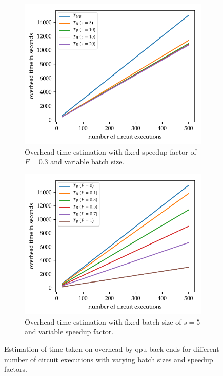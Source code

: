 \begin{figure}[ht]
    \centering
    \begin{subfigure}{.49\textwidth}
        \centering
        \includegraphics[width=1\linewidth]{figures/pso_batch_times_batch_sizes.pdf}
        \caption{Overhead time estimation with fixed speedup factor of $F = 0.3$ and variable batch size.}
        \label{fig:batching-times-batch-size}
    \end{subfigure}
    \hfill
    \begin{subfigure}{.49\textwidth}
        \centering
        \includegraphics[width=1\linewidth]{figures/pso_batch_times_speedup_factor.pdf}
        \caption{Overhead time estimation with fixed batch size of $s = 5$ and variable speedup factor.}
        \label{fig:batching-times-speedup-factors}
    \end{subfigure}
    
    \caption{
        Estimation of time taken on overhead by \gls{qpu} back-ends for different number of circuit executions with varying batch sizes and speedup factors.
    }
\end{figure}

